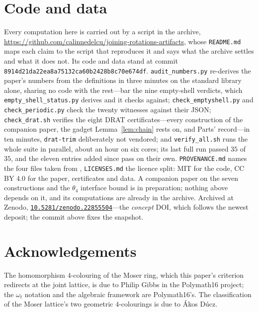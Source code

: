 \documentclass[11pt,reqno]{amsart}
\newcommand{\doi}[1]{\href{https://doi.org/#1}{\texttt{#1}}}
\theoremstyle{plain}
\theoremstyle{definition}
\begin{document}
\section*{Code and data}

Every computation here is carried out by a script in the archive,
\url{https://github.com/calinnedelcu/joining-rotations-artifacts}, whose
\texttt{README.md} maps each claim to the script that reproduces it and says what
the archive settles and what it does not. Its code and data stand at commit
\texttt{8914d21da22ea8a75132ca60b2428b8c70e674df}.
\texttt{audit\_numbers.py} re-derives the paper's numbers from the definitions in
three minutes on the standard library alone, sharing no code with the rest---bar
the nine empty-shell verdicts, which \texttt{empty\_shell\_status.py} derives and
it checks against;
\texttt{check\_emptyshell.py} and \texttt{check\_periodic.py} check the twenty
witnesses against their JSON;
\texttt{check\_drat.sh} verifies the eight DRAT certificates---every construction
of the companion paper, the gadget Lemma~\ref{lem:chain} rests on, and Parts'
record---in ten minutes, \texttt{drat-trim} deliberately not vendored; and
\texttt{verify\_all.sh} runs
the whole suite in parallel, about an hour on six cores; its last full run passed
$35$ of $35$, and the eleven entries added since pass on their own. \texttt{PROVENANCE.md}
names the four files taken from \cite{Parts}, \texttt{LICENSES.md} the licence split: MIT for the
code, CC BY 4.0 for the paper, certificates and data. A companion paper on the
seven constructions and the $\theta_4$ interface bound is in preparation; nothing
above depends on it, and its computations are already in the archive. Archived at
Zenodo, \doi{10.5281/zenodo.22855504}---the \emph{concept} DOI, which follows the
newest deposit; the commit above fixes the snapshot.

\section*{Acknowledgements}

The homomorphism $4$-colouring of the Moser ring, which this paper's criterion
redirects at the joint lattice, is due to Philip Gibbs in the Polymath16 project;
the $\omega_t$ notation and the algebraic framework are Polymath16's. The
classification of the Moser lattice's two geometric $4$-colourings is due to
\'Akos D\'ucz.
\end{document}

